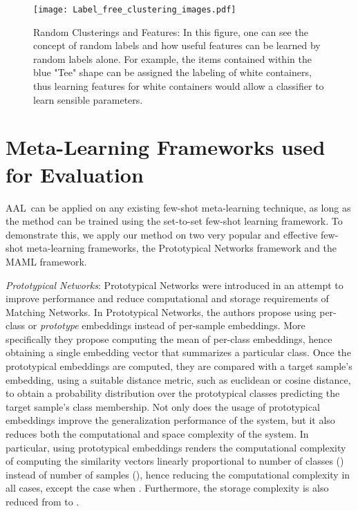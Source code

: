\documentclass{article}
\newcommand{\untrain}{AAL}
\begin{document}
\begin{figure}[ht]
	\centering
	\texttt{[image: Label\_free\_clustering\_images.pdf]}
	\caption{Random Clusterings and Features: In this figure, one can see the concept of random labels and how useful features can be learned by random labels alone. For example, the items contained within the blue "Tee" shape can be assigned the labeling of white containers, thus learning features for white containers would allow a classifier to learn sensible parameters.}
	\label{fig:random_clusters}
\vspace{-8mm}
\end{figure}

\section{Meta-Learning Frameworks used for Evaluation}
\untrain\ can be applied on any existing few-shot meta-learning technique, as long as the method can be trained using the set-to-set few-shot learning framework. To demonstrate this, we apply our method on two very popular and effective few-shot meta-learning frameworks, the Prototypical Networks framework and the MAML framework. 

\emph{Prototypical Networks}:
Prototypical Networks \cite{snell2017prototypical} were introduced in an attempt to improve performance and reduce computational and storage requirements of Matching Networks. In Prototypical Networks, the authors propose using per-class or \emph{prototype} embeddings instead of per-sample embeddings. More specifically they propose computing the mean of per-class embeddings, hence obtaining a single embedding vector that summarizes a particular class. Once the prototypical embeddings are computed, they are compared with a target sample's embedding, using a suitable distance metric, such as euclidean or cosine distance, to obtain a probability distribution over the prototypical classes predicting the target sample's class membership. Not only does the usage of prototypical embeddings improve the generalization performance of the system, but it also reduces both the computational and space complexity of the system. In particular, using prototypical embeddings renders the computational complexity of computing the similarity vectors linearly proportional to number of classes () instead of number of samples (), hence reducing the computational complexity in all cases, except the case when . Furthermore, the storage complexity is also reduced from  to . 
\end{document}

